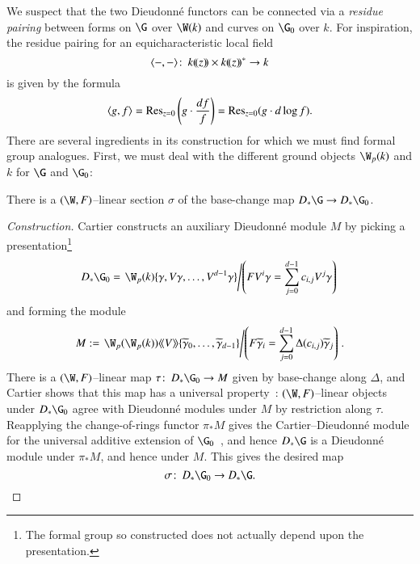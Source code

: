 We suspect that the two Dieudonn\'e functors can be connected via a \textit{residue pairing} between forms on $\G$ over $\W(k)$ and curves on $\G_0$ over $k$.  For inspiration, the residue pairing for an equicharacteristic local field \[\langle-,-\rangle\colon\thinspace k(\!(z)\!) \times k(\!(z)\!)^* \to k\] is given by the formula \[\langle g, f\rangle = \operatorname{Res}_{z=0}\left(g \cdot \frac{df}{f}\right) = \operatorname{Res}_{z=0}(g \cdot d\log f).\]  There are several ingredients in its construction for which we must find formal group analogues.  First, we must deal with the different ground objects $\W_p(k)$ and $k$ for $\G$ and $\G_0$:
\begin{lemma}
There is a $(\W, F)$--linear section $\sigma$ of the base-change map $D_* \G \to D_* \G_0$.
\end{lemma}
\begin{proof}[Construction]
Cartier constructs an auxiliary Dieudonn\'e module $M$ by picking a presentation\footnote{The formal group so constructed does not actually depend upon the presentation.} \[D_* \G_0 = \left.\W_p(k)\{\gamma, V\gamma, \ldots, V^{d-1} \gamma\} \middle/ \left(F V^i \gamma = \sum_{j=0}^{d-1} c_{i,j} V^j \gamma\right) \right.\] and forming the module \[M := \left.\W_p(\W_p(k))\<\!\<V\>\!\>\{\widetilde\gamma_0, \ldots, \widetilde\gamma_{d-1}\} \middle/ \left(F \widetilde \gamma_i = \sum_{j=0}^{d-1} \Delta(c_{i,j}) \widetilde\gamma_j\right) \right. .\]  There is a $(\W, F)$--linear map $\tau\co D_* \G_0 \to M$ given by base-change along $\Delta$, and Cartier shows that this map has a universal property~\cite[VII.2.9]{LazardCFGs}: $(\W, F)$--linear objects under $D_* \G_0$ agree with Dieudonn\'e modules under $M$ by restriction along $\tau$.  Reapplying the change-of-rings functor $\pi_* M$ gives the Cartier--Dieudonn\'e module for the universal additive extension of $\G_0$~\cite[V.6.22 and VII.2.28]{LazardCFGs}, and hence $D_* \G$ is a Dieudonn\'e module under $\pi_* M$, and hence under $M$.  This gives the desired map \[\sigma\co D_* \G_0 \to D_* \G. \qedhere\]
\end{proof}

